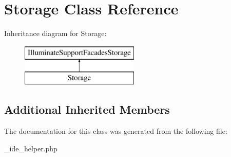 \hypertarget{class_storage}{}\section{Storage Class Reference}
\label{class_storage}
Inheritance diagram for Storage\+:\begin{figure}[H]
\begin{center}
\leavevmode
\includegraphics[height=2.000000cm]{class_storage}
\end{center}
\end{figure}
\subsection*{Additional Inherited Members}


The documentation for this class was generated from the following file\+:\begin{DoxyCompactItemize}
\item 
\+\_\+ide\+\_\+helper.\+php\end{DoxyCompactItemize}
